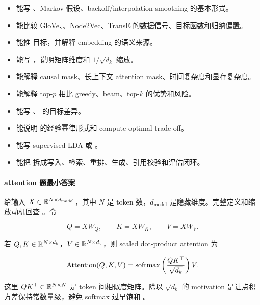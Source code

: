 \begin{itemize}
  \item 能写 、Markov 假设、backoff/interpolation smoothing 的基本形式。
  \item 能比较 GloVe、、Node2Vec、TransE 的数据信号、目标函数和归纳偏置。
  \item 能推  目标，并解释 embedding 的语义来源。
  \item 能写 ，说明矩阵维度和 \(1/\sqrt{d_k}\) 缩放。
  \item 能解释 causal mask、长上下文 attention mask、时间复杂度和显存复杂度。
  \item 能解释 top-\(p\) 相比 greedy、beam、top-\(k\) 的优势和风险。
  \item 能写 、 的目标差异。
  \item 能说明  的经验幂律形式和 compute-optimal trade-off。
  \item 能写 supervised LDA 或 。
  \item 能把 拆成写入、检索、重排、生成、引用校验和评估闭环。
\end{itemize}

\paragraph{attention 题最小答案}

给输入 \(X\in\mathbb{R}^{N\times d_{\mathrm{model}}}\)，其中 \(N\) 是 token 数，\(d_{\mathrm{model}}\) 是隐藏维度。完整定义和缩放动机回查 。令

\[
  Q=XW_Q,\qquad
  K=XW_K,\qquad
  V=XW_V.
\]

若 \(Q,K\in\mathbb{R}^{N\times d_k}\)，\(V\in\mathbb{R}^{N\times d_v}\)，则 scaled dot-product attention 为

\[
  \operatorname{Attention}(Q,K,V)
  =
  \operatorname{softmax}\left(\frac{QK^\top}{\sqrt{d_k}}\right)V.
\]

这里 \(QK^\top\in\mathbb{R}^{N\times N}\) 是 token 间相似度矩阵。除以 \(\sqrt{d_k}\) 的 motivation 是让点积方差保持常数量级，避免 softmax 过早饱和 \parencite{vaswani2017attention}。

